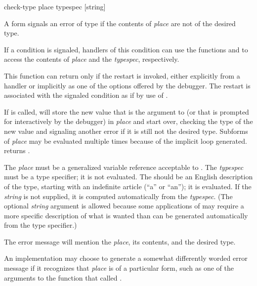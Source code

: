 \begin{defmac}
check-type place typespec [string]

A  form signals an error of type  if the
contents of \emph{place} are not of the desired type.

If a condition is signaled, handlers of this condition can use the functions
 and  to access the contents
of \emph{place} and the \emph{typespec}, respectively.

This function can return only if the  restart is invoked,
either explicitly from a handler or implicitly as one of the options offered by
the debugger.  The restart is associated with the signaled condition as if by
use of .

If  is called,  will store the new value that
is the argument to  (or that is prompted for interactively by
the debugger) in \emph{place} and start over, checking the type of the new value
and signaling another error if it is still not the desired type. Subforms of
\emph{place} may be evaluated multiple times because of the implicit loop
generated.  returns .

The \emph{place} must be a generalized variable reference acceptable to
. The \emph{typespec} must be a type specifier; it is not evaluated.
The  should be an English description of the type, starting with an
indefinite article (``a'' or ``an''); it is evaluated. If the \emph{string} is
not supplied, it is computed automatically from the \emph{typespec}. (The
optional \emph{string} argument is allowed because some applications of
 may require a more specific description of what is wanted than
can be generated automatically from the type specifier.)

The error message will mention the \emph{place}, its contents, and the desired
type.

\beforenoterule
\begin{implementation}
  An implementation may choose to generate a somewhat differently worded error
  message if it recognizes that \emph{place} is of a particular form, such as
  one of the arguments to the function that called .
\end{implementation}
\afternoterule


\end{defmac}
